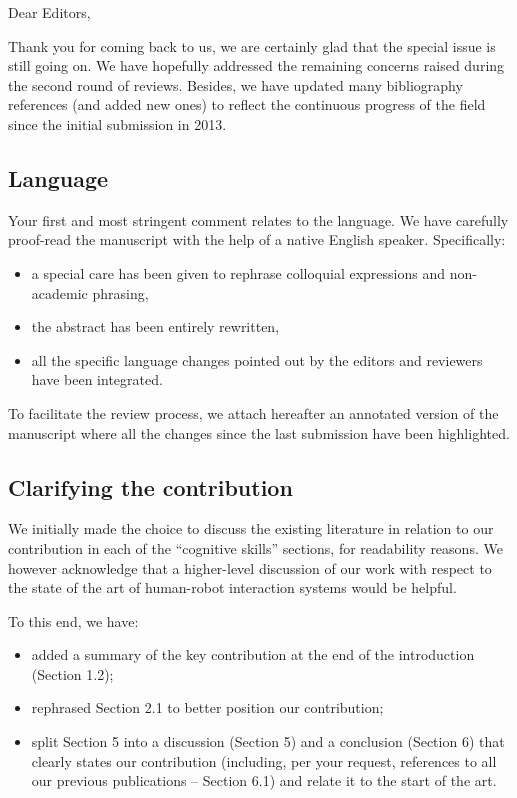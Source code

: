 \documentclass{article}
\begin{document}
Dear Editors,

\vspace{2em}

Thank you for coming back to us, we are certainly glad that the special issue is
still going on.  We have hopefully addressed the remaining concerns raised
during the second round of reviews.  Besides, we have updated many bibliography
references (and added new ones) to reflect the continuous progress of the field
since the initial submission in 2013.

\subsection*{Language}

Your first and most stringent comment relates to the language. We have carefully
proof-read the manuscript with the help of a native English speaker.
Specifically:

\begin{itemize}
    \item a special care has been given to rephrase colloquial expressions and
        non-academic phrasing,
    \item the abstract has been entirely rewritten,
    \item all the specific language changes pointed out by the editors and
        reviewers have been integrated.
\end{itemize}

To facilitate the review process, we attach hereafter an annotated version of the
manuscript where all the changes since the last submission have been highlighted.

\subsection*{Clarifying the contribution}

We initially made the choice to discuss the existing literature in relation to
our contribution in each of the ``cognitive skills'' sections, for readability
reasons. We however acknowledge that a higher-level discussion of our work with
respect to the state of the art of human-robot interaction systems would be
helpful.

To this end, we have:

\begin{itemize}
    \item added a summary of the key contribution at the end of the introduction
        (Section 1.2);
    \item rephrased Section 2.1 to better position our contribution;
    \item split Section 5 into a discussion (Section 5) and a
conclusion (Section 6) that clearly states our contribution (including, per your
request, references to all our previous publications -- Section 6.1) and relate
it to the start of the art.
\end{itemize}
\end{document}
